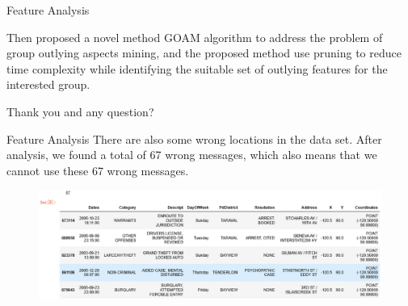 \documentclass[
 size=14pt,
 paper=smartboard,  %
 mode=present, 		%
 display=slides, 	%
 style=tuliplab,  	%
 pauseslide,
 fleqn,leqno]{powerdot}
\begin{document}
\begin{slide}[toc=,bm=]{Feature Analysis}
\begin{note}
Then proposed a novel method GOAM algorithm to address the problem of
group outlying aspects mining,
and the proposed method use pruning to reduce time complexity
while identifying the suitable set of outlying features for the interested group.

Thank you and any question?
\end{note}

\end{slide}

\begin{slide}{Feature Analysis}
  There are also some wrong locations in the data set. After analysis, we 
  found a total of 67 wrong messages, which also means that we cannot use
   these 67 wrong messages.
  \begin{figure}
    \centering
    \includegraphics[width=1\textwidth]{kaggle/6.1.eps}
  \end{figure}


\end{slide}



\end{document}
